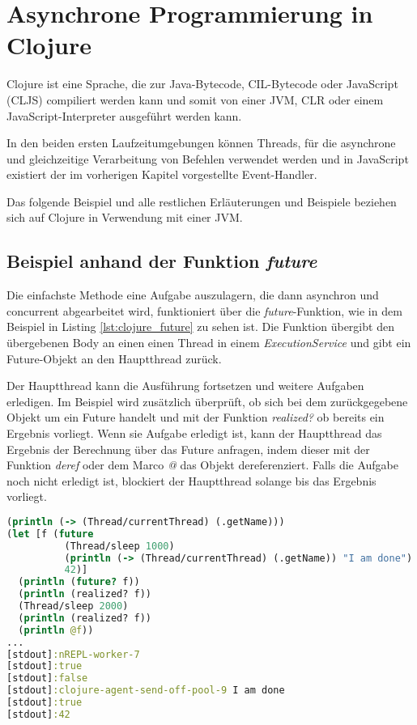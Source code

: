 \section{Asynchrone Programmierung in Clojure}

Clojure ist eine Sprache, die zur Java-Bytecode, CIL-Bytecode oder JavaScript (\acl{CLJS}) compiliert werden kann und somit von einer \ac{JVM}, \ac{CLR} oder einem JavaScript-Interpreter ausgeführt werden kann.

In den beiden ersten Laufzeitumgebungen können Threads, für die asynchrone und gleichzeitige Verarbeitung von Befehlen verwendet werden und in JavaScript existiert der im vorherigen Kapitel vorgestellte Event-Handler.

Das folgende Beispiel und alle restlichen Erläuterungen und Beispiele beziehen sich auf Clojure in Verwendung mit einer \ac{JVM}.

\subsection*{Beispiel anhand der Funktion \textit{future}}
Die einfachste Methode eine Aufgabe auszulagern, die dann asynchron und concurrent abgearbeitet wird, funktioniert über die \textit{future}-Funktion, wie in dem Beispiel in Listing \ref{lst:clojure_future} zu sehen ist. Die Funktion übergibt den übergebenen Body an einen einen Thread in einem \textit{ExecutionService} und gibt ein Future-Objekt an den Hauptthread zurück.

Der Hauptthread kann die Ausführung fortsetzen und weitere Aufgaben erledigen. Im Beispiel wird zusätzlich überprüft, ob sich bei dem zurückgegebene Objekt um ein Future handelt und mit der Funktion  \textit{realized?} ob bereits ein Ergebnis vorliegt. Wenn sie Aufgabe erledigt ist, kann der Hauptthread das Ergebnis der Berechnung über das Future anfragen, indem dieser mit der Funktion \textit{deref} oder dem Marco  \textit{@} das Objekt dereferenziert. Falls die Aufgabe noch nicht erledigt ist, blockiert der Hauptthread solange bis das Ergebnis vorliegt.

\begin{lstlisting}[language=Clojure,caption=Das asynchrone Ausführen von Befehlen mit der Funktion \textit{future},label=lst:clojure_future]
(println (-> (Thread/currentThread) (.getName)))
(let [f (future
          (Thread/sleep 1000)
          (println (-> (Thread/currentThread) (.getName)) "I am done")
          42)]
  (println (future? f))
  (println (realized? f))
  (Thread/sleep 2000)
  (println (realized? f))
  (println @f))
...
[stdout]:nREPL-worker-7
[stdout]:true
[stdout]:false
[stdout]:clojure-agent-send-off-pool-9 I am done
[stdout]:true
[stdout]:42
\end{lstlisting}

